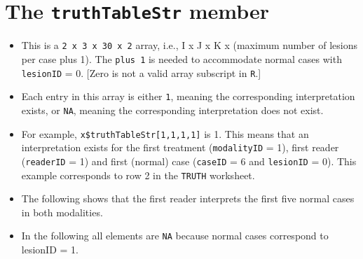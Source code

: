 \documentclass[]{book}
\newenvironment{Shaded}{\begin{snugshade}}{\end{snugshade}}
\newcommand{\CommentTok}[1]{\textcolor[rgb]{0.56,0.35,0.01}{\textit{#1}}}
\newcommand{\DecValTok}[1]{\textcolor[rgb]{0.00,0.00,0.81}{#1}}
\newcommand{\NormalTok}[1]{#1}
\newcommand{\OperatorTok}[1]{\textcolor[rgb]{0.81,0.36,0.00}{\textbf{#1}}}
\providecommand{\tightlist}{%
  \setlength{\itemsep}{0pt}\setlength{\parskip}{0pt}}
\begin{document}
\hypertarget{the-truthtablestr-member}{%
\section{\texorpdfstring{The \texttt{truthTableStr} member}{The truthTableStr member}}\label{the-truthtablestr-member}}

\begin{itemize}
\tightlist
\item
  This is a \texttt{2\ x\ 3\ x\ 30\ x\ 2} array, i.e., I x J x K x (maximum number of lesions per case plus 1). The \texttt{plus\ 1} is needed to accommodate normal cases with \texttt{lesionID} = 0. {[}Zero is not a valid array subscript in \texttt{R}.{]}
\item
  Each entry in this array is either \texttt{1}, meaning the corresponding interpretation exists, or \texttt{NA}, meaning the corresponding interpretation does not exist.
\item
  For example, \texttt{x\$truthTableStr{[}1,1,1,1{]}} is 1. This means that an interpretation exists for the first treatment (\texttt{modalityID} = 1), first reader (\texttt{readerID} = 1) and first (normal) case (\texttt{caseID} = 6 and \texttt{lesionID} = 0). This example corresponds to row 2 in the \texttt{TRUTH} worksheet.
\item
  The following shows that the first reader interprets the first five normal cases in both modalities.
\end{itemize}

\begin{Shaded}
\end{Shaded}

\begin{itemize}
\tightlist
\item
  In the following all elements are \texttt{NA} because normal cases correspond to lesionID = 1.
\end{itemize}
\end{document}
